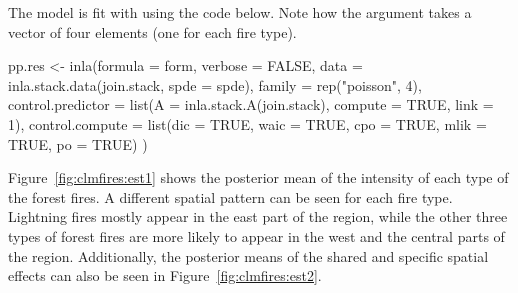 The model is fit with  using the code below. Note how the  argument takes a vector of four  elements (one for each fire type). 

\begin{example*}
pp.res <- inla(formula = form, verbose = FALSE, 
  data = inla.stack.data(join.stack, spde = spde), 
  family = rep("poisson", 4), 
  control.predictor = list(A = inla.stack.A(join.stack), compute = TRUE, link = 1),
  control.compute = list(dic = TRUE, waic = TRUE, cpo = TRUE, mlik = TRUE, po = TRUE)
)
\end{example*}

Figure~\ref{fig:clmfires:est1} shows the posterior mean of the intensity of each type of the forest fires. A different spatial pattern can be seen for each fire type. Lightning fires mostly appear in the east part of the region, while the other three types of forest fires are more likely to appear in the west and the central parts of the region. Additionally, the posterior means of the shared and specific spatial effects can also be seen in Figure~\ref{fig:clmfires:est2}. 

